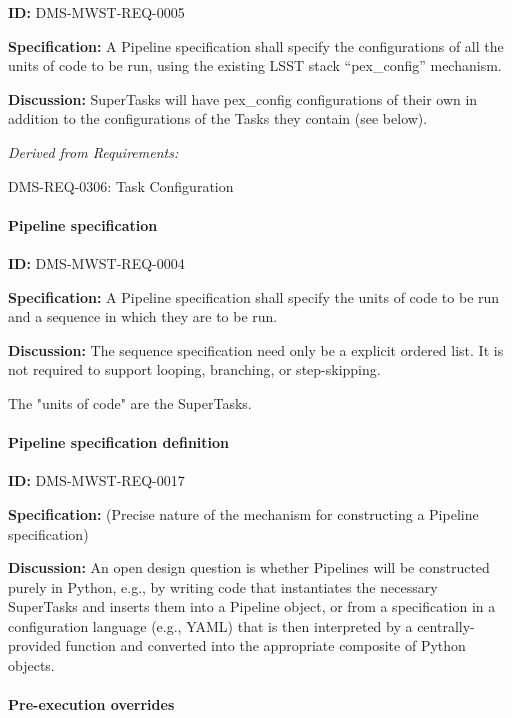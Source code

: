 \documentclass[SE,toc,lsstdraft]{lsstdoc}
\begin{document}
\label{DMS-MWST-REQ-0005}
\textbf{ID:} DMS-MWST-REQ-0005

\textbf{Specification:}
A Pipeline specification shall specify the configurations of all the units of code to be run, using the existing LSST stack “pex\_config” mechanism.

\textbf{Discussion:}
SuperTasks will have pex\_config configurations of their own in addition to the configurations of the Tasks they contain (see below).

\emph{Derived from Requirements:}

DMS-REQ-0306:
Task Configuration \newline

\paragraph{Pipeline specification}\hfill  %

\label{DMS-MWST-REQ-0004}
\textbf{ID:} DMS-MWST-REQ-0004

\textbf{Specification:}
A Pipeline specification shall specify the units of code to be run and a sequence in which they are to be run.

\textbf{Discussion:}
The sequence specification need only be a explicit ordered list.  It is not required to support looping, branching, or step-skipping.

The "units of code" are the SuperTasks.

\paragraph{Pipeline specification definition}\hfill  %

\label{DMS-MWST-REQ-0017}
\textbf{ID:} DMS-MWST-REQ-0017

\textbf{Specification:}
(Precise nature of the mechanism for constructing a Pipeline specification)

\textbf{Discussion:}
An open design question is whether Pipelines will be constructed purely in Python, e.g., by writing code that instantiates the necessary SuperTasks and inserts them into a Pipeline object, or from a specification in a configuration language (e.g., YAML) that is then interpreted by a centrally-provided function and converted into the appropriate composite of Python objects.

\paragraph{Pre-execution overrides}\hfill  %
\end{document}
